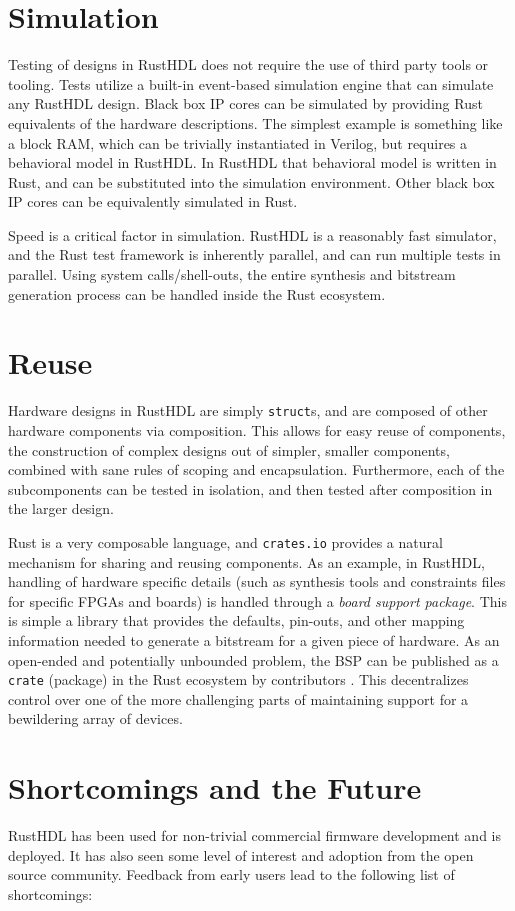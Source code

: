 \documentclass[sigplan,screen,sigconf]{acmart}
\begin{document}
\section{Simulation}
Testing of designs in RustHDL does not require the use of third party tools or tooling.  
Tests utilize a built-in event-based simulation engine that can simulate any RustHDL design.
Black box IP cores can be simulated by providing Rust equivalents of the hardware descriptions.
The simplest example is something like a block RAM, which can be trivially instantiated in 
Verilog, but requires a behavioral model in RustHDL.  In RustHDL that behavioral model is 
written in Rust, and can be substituted into the simulation environment.  Other black box
IP cores can be equivalently simulated in Rust.

Speed is a critical factor in simulation.  RustHDL is a reasonably fast simulator, 
and the Rust test framework is inherently parallel, and can run multiple tests in parallel. 
Using system calls/shell-outs, the entire synthesis and bitstream generation process 
can be handled inside the Rust ecosystem.

\section{Reuse}
Hardware designs in RustHDL are simply \verb|struct|s, and are composed of other 
hardware components via composition.  This allows for easy reuse of components, the
construction of complex designs out of simpler, smaller components, combined with sane rules of
scoping and encapsulation.  Furthermore, each of the subcomponents can be tested in 
isolation, and then tested after composition in the larger design. 

Rust is a very composable language, and \verb|crates.io| provides a natural mechanism
for sharing and reusing components.  As an example, in RustHDL, handling of hardware specific
details (such as synthesis tools and constraints files for specific FPGAs and boards) is 
handled through a \emph{board support package}.  This is simple a library that provides the
defaults, pin-outs, and other mapping information needed to generate a bitstream for a given piece of
hardware.  As an open-ended and potentially unbounded problem, the BSP can be published as
a \verb|crate| (package) in the Rust ecosystem by contributors \cite{b7}.  This decentralizes control
over one of the more challenging parts of maintaining support for a bewildering array of 
devices. 

\section{Shortcomings and the Future}
RustHDL has been used for non-trivial commercial firmware development and is deployed.  It has also seen 
some level of interest and adoption from the open source community.  Feedback from early users 
lead to the following list of shortcomings:
\end{document}
